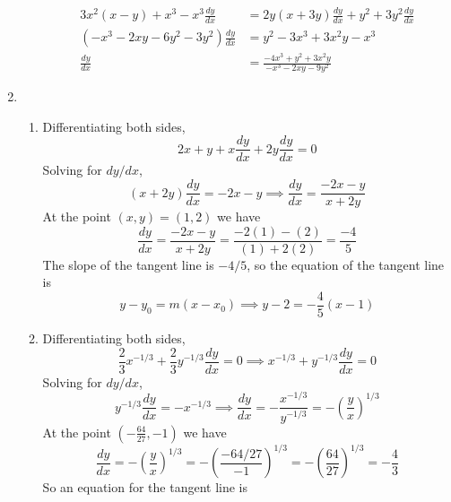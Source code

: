 \documentclass{article}
\newcommand{\ds}{\displaystyle}
\begin{document}
\begin{enumerate}
\begin{enumerate}
\begin{align*}
      3x^2(x-y) + x^3 - x^3 \frac{dy}{dx} &= 2y(x+3y) \frac{dy}{dx} +
      y^2 + 3y^2 \frac{dy}{dx} \\
      (-x^3 - 2xy - 6y^2 - 3y^2) \frac{dy}{dx} &= y^2 - 3x^3 + 3x^2y -
      x^3 \\
      \frac{dy}{dx} &= \frac{-4x^3 + y^2 + 3x^2y}{-x^3-2xy-9y^2}
    \end{align*}
  \end{enumerate}
\item %
  \begin{enumerate}
  \item Differentiating both sides,
    \begin{equation*}
      2x + y + x\frac{dy}{dx} + 2y \frac{dy}{dx} = 0
    \end{equation*}
    Solving for $dy/dx$,
    \begin{equation*}
      (x+2y) \frac{dy}{dx} = -2x-y \implies \frac{dy}{dx} =
      \frac{-2x-y}{x+2y}
    \end{equation*}
    At the point $(x,y)=(1,2)$ we have 
    \begin{equation*}
      \frac{dy}{dx} = \frac{-2x-y}{x+2y} = \frac{-2(1)-(2)}{(1)+2(2)}
      = \frac{-4}{5}
    \end{equation*}
    The slope of the tangent line is $-4/5$, so the equation of the
    tangent line is
    \begin{equation*}
      y-y_0 = m(x-x_0) \implies y-2 = -\frac{4}{5} (x-1)
    \end{equation*}
  \item Differentiating both sides,
    \begin{equation*}
      \frac{2}{3} x^{-1/3} + \frac{2}{3} y^{-1/3} \frac{dy}{dx} = 0
      \implies x^{-1/3} + y^{-1/3} \frac{dy}{dx} = 0
    \end{equation*}
    Solving for $dy/dx$,
    \begin{equation*}
      y^{-1/3} \frac{dy}{dx} = -x^{-1/3}
      \implies \frac{dy}{dx} = -\frac{x^{-1/3}}{y^{-1/3}} =
      -\left(\frac{y}{x}\right)^{1/3} 
    \end{equation*}
    At the point $\ds \left(-\frac{64}{27},-1\right)$ we have
    \begin{equation*}
      \frac{dy}{dx} = -\left(\frac{y}{x}\right)^{1/3} =
      -\left(\frac{-64/27}{-1}\right)^{1/3} =
      -\left(\frac{64}{27}\right)^{1/3} = -\frac{4}{3}
    \end{equation*}
    So an equation for the tangent line is
    \begin{equation*}

\end{equation*}
\end{enumerate}
\end{enumerate}
\end{document}
